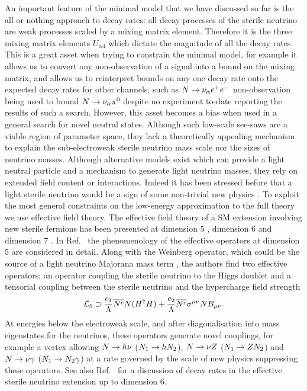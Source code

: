 \documentclass[11pt, a4paper]{article}
\newcommand{\refref}[1]{Ref.~\cite{#1}}
\def\ster{\ensuremath N}
\begin{document}
An important feature of the minimal model that we have discussed so far is the
all or nothing approach to decay rates: all decay processes of the sterile
neutrino are weak processes scaled by a mixing matrix element. 
%
Therefore it is the three mixing matrix elements $U_{\alpha 4}$ which dictate
the magnitude of all the decay rates. This is a great asset when trying to
constrain the  minimal model, for example it allows us to convert any
non-observation of a signal into a bound on the mixing matrix, and allows us to
reinterpret bounds on any one decay rate onto the expected decay rates for
other channels, such as $\ster \rightarrow \nu_\alpha e^+ e^-$ non-observation
being used to bound $\ster \rightarrow \nu_\alpha \pi^0$ despite no experiment
to-date reporting the results of such a search. 
%
However, this asset becomes a bias when used in a general search for novel
neutral states. Although such low-scale see-saws are a viable region of
parameter space, they lack a theoretically appealing mechanism to explain the
sub-electroweak sterile neutrino mass scale nor the sizes of neutrino masses.
Although alternative models exist which can provide a light neutral particle
and a mechanism to generate light neutrino masses, they rely on extended field
content or interactions.
%
Indeed it has been stressed before that a light sterile neutrino would be a
sign of some non-trivial new physics \cite{delAguila:2008ir}. To exploit the
most general constraints on the low-energy approximation to the full theory we
use effective field theory. The effective field theory of a SM extension
involving new sterile fermions has been presented at dimension 5
\cite{delAguila:2008ir,Aparici:2009fh}, dimension 6 \cite{delAguila:2008ir} and
dimension 7 \cite{Bhattacharya:2015vja}.
%
In \refref{Aparici:2009fh} the phenomenology of the effective operators at
dimension 5 are considered in detail. Along with the Weinberg operator, which
could be the source of a light neutrino Majorana mass term
\cite{Weinberg:1979sa}, the authors find two effective operators: an operator
coupling the sterile neutrino to the Higgs doublet and a tensorial coupling
between the sterile neutrino and the hypercharge field strength 
%
\[ \mathcal{L}_5 \supset \frac{c_1}{\Lambda}\overline{\ster^c}\ster(H^\dagger
H) + \frac{c_2}{\Lambda}\overline{\ster^c}\sigma^{\mu\nu}\ster B_{\mu\nu}. \] 
%
At energies below the electroweak scale, and after diagonalisation into mass
eigenstates for the neutrinos, these operators generate novel couplings, for
example a vertex allowing $\ster\to h \nu$ ($\ster_1\to h \ster_2$), $\ster\to
\nu Z$ ($\ster_1\to Z \ster_2$) and $\ster \to \nu \gamma$ ($\ster_1 \to
\ster_2 \gamma$) at a rate governed by the scale of new physics suppressing
these operators. See also \refref{Duarte:2016miz} for a discussion of decay
rates in the effective sterile neutrino extension up to dimension 6.
\end{document}

